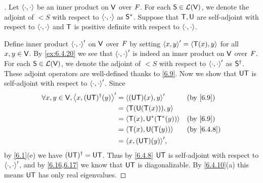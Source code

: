\begin{proof}[]
  Let \(\left\langle\cdot, \cdot\right\rangle\) be an inner product on \(\mathsf{V}\) over \(\mathit{F}\).
  For each \(\mathsf{S} \in \mathcal{L}(\mathsf{V})\), we denote the adjoint of \(\lt{S}\) with respect to \(\left\langle\cdot, \cdot\right\rangle\) as \(\mathsf{S}^*\).
  Suppose that \(\mathsf{T}, \mathsf{U}\) are self-adjoint with respect to \(\left\langle\cdot, \cdot\right\rangle\) and \(\mathsf{T}\) is positive definite with respect to \(\left\langle\cdot, \cdot\right\rangle\).

  Define inner product \(\left\langle\cdot, \cdot\right\rangle'\) on \(\mathsf{V}\) over \(\mathit{F}\) by setting \(\left\langle x, y\right\rangle' = \left\langle\mathsf{T}(x), y\right\rangle\) for all \(x, y \in \mathsf{V}\).
  By \cref{ex:6.4.20} we see that \(\left\langle\cdot, \cdot\right\rangle'\) is indeed an inner product on \(\mathsf{V}\) over \(\mathit{F}\).
  For each \(\mathsf{S} \in \mathcal{L}(\mathsf{V})\), we denote the adjoint of \(\lt{S}\) with respect to \(\left\langle\cdot, \cdot\right\rangle'\) as \(\mathsf{S}^{\dag}\).
  These adjoint operators are well-defined thanks to \cref{6.9}.
  Now we show that \(\mathsf{U} \mathsf{T}\) is self-adjoint with respect to \(\left\langle\cdot, \cdot\right\rangle'\).
  Since
  \begin{align*}
    \forall x, y \in \V, \inn{x, (\U \T)^{\dag}(y)}' & = \inn{(\U \T)(x), y}'       &  & \text{(by \cref{6.9})}   \\
                                                     & = \inn{\T(\U(\T(x))), y}                                   \\
                                                     & = \inn{\T(x), \U^*(\T^*(y))} &  & \text{(by \cref{6.9})}   \\
                                                     & = \inn{\T(x), \U(\T(y))}     &  & \text{(by \cref{6.4.8})} \\
                                                     & = \inn{x, (\U \T)(y)}',
  \end{align*}
  by \cref{6.1}(e) we have \((\mathsf{U} \mathsf{T})^{\dag} = \mathsf{U} \mathsf{T}\).
  Thus by \cref{6.4.8} \(\mathsf{U} \mathsf{T}\) is self-adjoint with respect to \(\left\langle\cdot, \cdot\right\rangle'\), and by \cref{6.16,6.17} we know that \(\mathsf{U} \mathsf{T}\) is diagonalizable.
  By \cref{6.4.10}(a) this means \(\mathsf{U} \mathsf{T}\) has only real eigenvalues.


\end{proof}
